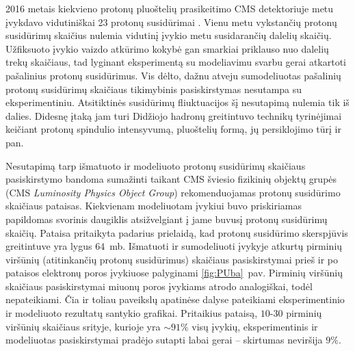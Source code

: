 \documentclass[a4paper, 12pt, oneside]{article}
\begin{document}
2016 metais kiekvieno protonų pluoštelių prasikeitimo CMS detektoriuje metu įvykdavo vidutiniškai 23 protonų
susidūrimai \cite{CMSLumi}.
Vienu metu vykstančių protonų susidūrimų skaičius nulemia vidutinį įvykio metu susidarančių dalelių skaičių.
Užfiksuoto įvykio vaizdo atkūrimo kokybė gan smarkiai priklauso nuo dalelių trekų skaičiaus, tad lyginant
eksperimentą su modeliavimu svarbu gerai atkartoti pašalinius protonų susidūrimus.
Vis dėlto, dažnu atveju sumodeliuotas pašalinių protonų susidūrimų skaičiaus tikimybinis pasiskirstymas
nesutampa su eksperimentiniu.
Atsitiktinės susidūrimų fliuktuacijos šį nesutapimą nulemia tik iš dalies.
Didesnę įtaką jam turi Didžiojo hadronų greitintuvo technikų tyrinėjimai keičiant protonų spindulio intensyvumą,
pluoštelių formą, jų persiklojimo tūrį ir pan.

Nesutapimą tarp išmatuoto ir modeliuoto protonų susidūrimų skaičiaus pasiskirstymo bandoma sumažinti taikant
CMS šviesio fizikinių objektų grupės (CMS \textit{Luminosity Physics Object Group}) rekomenduojamas protonų
susidūrimo skaičiaus pataisas.
Kiekvienam modeliuotam įvykiui buvo priskiriamas papildomas svorinis daugiklis atsižvelgiant į jame buvusį protonų
susidūrimų skaičių.
Pataisa pritaikyta padarius prielaidą, kad protonų susidūrimo skerspjūvis greitintuve yra lygus $64$~mb.
Išmatuoti ir sumodeliuoti įvykyje atkurtų pirminių viršūnių (atitinkančių protonų susidūrimus) skaičiaus pasiskirstymai
prieš ir po pataisos elektronų poros įvykiuose palyginami \ref{fig:PUba}~pav.
Pirminių viršūnių skaičiaus pasiskirstymai miuonų poros įvykiams atrodo analogiškai, todėl nepateikiami.
Čia ir toliau paveikslų apatinėse dalyse pateikiami eksperimentinio ir modeliuoto rezultatų santykio grafikai.
Pritaikius pataisą, $10$-$30$ pirminių viršūnių skaičiaus srityje, kurioje yra $\sim\!91\%$ visų įvykių,
eksperimentinis ir modeliuotas pasiskirstymai pradėjo sutapti labai gerai -- skirtumas neviršija $9\%$.
\end{document}
